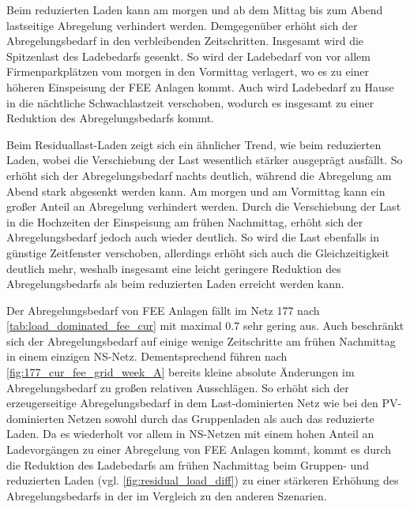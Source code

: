 Beim reduzierten Laden kann am morgen und ab dem Mittag bis zum Abend lastseitige Abregelung verhindert werden.
Demgegenüber erhöht sich der Abregelungsbedarf in den verbleibenden Zeitschritten.
Insgesamt wird die Spitzenlast des Ladebedarfs gesenkt.
So wird der Ladebedarf von vor allem Firmenparkplätzen vom morgen in den Vormittag verlagert, wo es zu einer höheren Einspeisung der \gls{FEE} Anlagen kommt.
Auch wird Ladebedarf zu Hause in die nächtliche Schwachlastzeit verschoben, wodurch es insgesamt zu einer Reduktion des Abregelungsbedarfs kommt.



Beim Residuallast-Laden zeigt sich ein ähnlicher Trend, wie beim reduzierten Laden, wobei die Verschiebung der Last wesentlich stärker ausgeprägt ausfällt.
So erhöht sich der Abregelungsbedarf nachts deutlich, während die Abregelung am Abend stark abgesenkt werden kann.
Am morgen und am Vormittag kann ein großer Anteil an Abregelung verhindert werden.
Durch die Verschiebung der Last in die Hochzeiten der Einspeisung am frühen Nachmittag, erhöht sich der Abregelungsbedarf jedoch auch wieder deutlich.
So wird die Last ebenfalls in günstige Zeitfenster verschoben, allerdings erhöht sich auch die Gleichzeitigkeit deutlich mehr, weshalb insgesamt eine leicht geringere Reduktion des Abregelungsbedarfs als beim reduzierten Laden erreicht werden kann.



Der Abregelungsbedarf von \gls{FEE} Anlagen fällt im Netz \num{177} nach \autoref{tab:load_dominated_fee_cur} mit maximal \SI{0.7}{\mwh} sehr gering aus.
Auch beschränkt sich der Abregelungsbedarf auf einige wenige Zeitschritte am frühen Nachmittag in einem einzigen \gls{NS}-Netz.
Dementsprechend führen nach \autoref{fig:177_cur_fee_grid_week_A} bereits kleine absolute Änderungen im Abregelungsbedarf zu großen relativen Ausschlägen.
So erhöht sich der erzeugerseitige Abregelungsbedarf in dem Last-dominierten Netz wie bei den \gls{PV}-dominierten Netzen sowohl durch das Gruppenladen als auch das reduzierte Laden.
Da es wiederholt vor allem in \gls{NS}-Netzen mit einem hohen Anteil an Ladevorgängen \zH zu einer Abregelung von \gls{FEE} Anlagen kommt, kommt es durch die Reduktion des Ladebedarfs am frühen Nachmittag beim Gruppen- und reduzierten Laden (vgl. \autoref{fig:residual_load_diff}) zu einer stärkeren Erhöhung des Abregelungsbedarfs in der \SzeFirmenparkplatz im Vergleich zu den anderen Szenarien.

